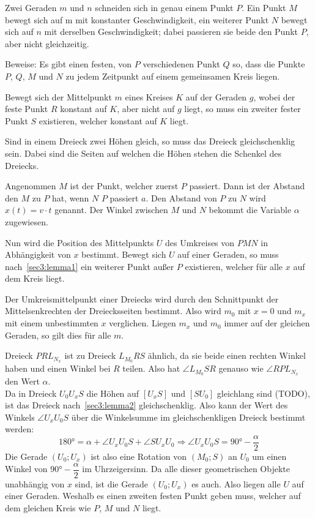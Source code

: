 \documentclass[10pt, a4paper]{amsart}
\makeatletter
\renewenvironment{proof}[1][\proofname]{\par
\pushQED{\qed}%
\normalfont \topsep6\p@\@plus6\p@\relax
\trivlist
\item\relax
{\bfseries#1}\hspace\labelsep\ignorespaces
}{%
\popQED\endtrivlist\@endpefalse
}
\makeatother
\begin{document}
\newpage
\begin{aufgabe}
  Zwei Geraden $m$ und $n$ schneiden sich in genau einem Punkt $P$. Ein Punkt
  $M$ bewegt sich auf m mit konstanter Geschwindigkeit, ein weiterer Punkt $N$
  bewegt sich auf $n$ mit derselben Geschwindigkeit; dabei passieren sie beide
  den Punkt $P$, aber nicht gleichzeitig.
 
  Beweise: Es gibt einen festen, von $P$ verschiedenen Punkt $Q$ so, dass die
  Punkte
  $P$, $Q$, $M$ und $N$ zu jedem Zeitpunkt auf einem gemeinsamen Kreis liegen.\\
\end{aufgabe}
\begin{lemma}\label{sec3:lemma1}
  Bewegt sich der Mittelpunkt $m$ eines Kreises $K$ auf der Geraden $g$, wobei
  der feste Punkt $R$ konstant auf $K$, aber nicht auf $g$ liegt, so muss ein
  zweiter fester Punkt $S$ existieren, welcher konstant auf $K$ liegt.
\end{lemma}
\begin{lemma}\label{sec3:lemma2}
  Sind in einem Dreieck zwei Höhen gleich, so muss das Dreieck gleichschenklig
  sein. Dabei sind die Seiten auf welchen die Höhen stehen die Schenkel des
  Dreiecks.
\end{lemma}
\begin{proof}
  Angenommen $M$ ist der Punkt, welcher zuerst $P$ passiert. Dann ist der
  Abstand den $M$ zu $P$ hat, wenn $N$ $P$ passiert $a$. Den Abstand von $P$ zu
  $N$ wird $x(t)=v\cdot{}t$ genannt. Der Winkel zwischen $M$ und $N$ bekommt die
  Variable $α$ zugewiesen.

  Nun wird die Position des Mittelpunkts $U$ des Umkreises von $PMN$ in
  Abhängigkeit von $x$ bestimmt. Bewegt sich $U$ auf einer Geraden, so muss
  nach~\autoref{sec3:lemma1} ein weiterer Punkt außer $P$ existieren, welcher
  für alle $x$ auf dem Kreis liegt.

  Der Umkreismittelpunkt einer Dreiecks wird durch den Schnittpunkt der
  Mittelsenkrechten der Dreiecksseiten bestimmt. Also wird $m_0$ mit $x=0$ und
  $m_x$ mit einem unbestimmten $x$ verglichen. Liegen $m_x$ und $m_0$ immer auf
  der gleichen Geraden, so gilt dies für alle $m$.


  Dreieck $PRL_{N_{x}}$ ist zu Dreieck $L_{M_0}RS$ ähnlich, da sie beide einen
  rechten Winkel haben und einen Winkel bei $R$ teilen. Also hat $\angle
  L_{M_0}SR$ genauso wie $\angle RPL_{N_x}$ den Wert $α$.\\
  Da in Dreieck $U_0U_xS$ die Höhen auf $[U_xS]$ und $[SU_0]$ gleichlang sind
  (TODO), ist das Dreieck nach~\autoref{sec3:lemma2} gleichschenklig. Also kann
  der Wert des Winkels $\angle U_xU_0S$ über die Winkelsumme im
  gleichschenkligen Dreieck bestimmt werden:
  \[180° = α + \angle U_xU_0S + \angle SU_xU_0 \Rightarrow \angle U_xU_0S =
    90°-\dfrac{α}{2} \] Die Gerade $(U_0;U_x)$ ist also eine Rotation von
  $(M_0;S)$ an $U_0$ um einen Winkel von $90°-\dfrac{α}{2}$ im Uhrzeigersinn. Da
  alle dieser geometrischen Objekte unabhängig von $x$ sind, ist die Gerade
  $(U_0;U_x)$ es auch. Also liegen alle $U$ auf einer Geraden. Weshalb es einen
  zweiten festen Punkt geben muss, welcher auf dem gleichen Kreis wie $P$, $M$
  und $N$ liegt.
\end{proof}
\end{document}
